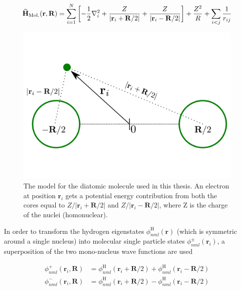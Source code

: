 \begin{equation}
 {\bf\widehat{H}}_{\mathrm{Mol.}}(\mathbf{r}, \mathbf{R}) = \sum_{i=1}^N \left[-\frac{1}{2}\nabla_i^2 + \frac{Z}{|\mathbf{r}_i + \mathbf{R}/2|} + \frac{Z}{|\mathbf{r}_i - \mathbf{R}/2|}\right] + \frac{Z^2}{R} + \sum_{i<j} \frac{1}{r_{ij}}
\end{equation}



\begin{figure}
 \begin{center}
  \includegraphics[scale=0.3]{../Graphics/Molecules.pdf}
  \caption{The model for the diatomic molecule used in this thesis. An electron at position $\mathbf{r}_i$ gets a potential energy contribution from both the cores equal to $Z/|\mathbf{r}_i + \mathbf{R}/2|$ and  $Z/|\mathbf{r}_i - \mathbf{R}/2|$, where Z is the charge of the nuclei (homonuclear).}
  \label{fig:dimolecules}
 \end{center}
\end{figure}


In order to transform the hydrogen eigenstates $\phi_{nml}^\mathrm{H}(\mathbf{r})$ (which is symmetric around a single nucleus) into molecular single particle states $\phi_{nml}^\pm (\mathbf{r}_i)$, a superposition of the two mono-nucleus wave functions are used

\begin{align}
 \phi_{nml}^+ (\mathbf{r}_i, \mathbf{R}) &= \phi_{nml}^\mathrm{H}(\mathbf{r}_i + \mathbf{R}/2) + \phi_{nml}^\mathrm{H}(\mathbf{r}_i - \mathbf{R}/2)\label{eq:moleculeTransPlus} \\
 \phi_{nml}^- (\mathbf{r}_i, \mathbf{R}) &= \phi_{nml}^\mathrm{H}(\mathbf{r}_i + \mathbf{R}/2) - \phi_{nml}^\mathrm{H}(\mathbf{r}_i - \mathbf{R}/2)\label{eq:moleculeTransMin}
\end{align}

